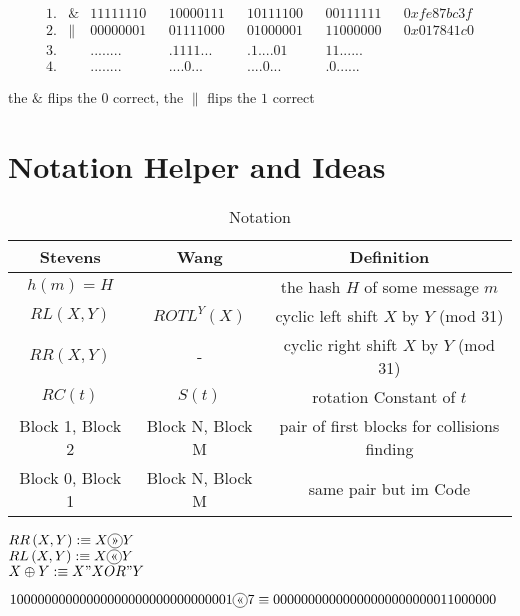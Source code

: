 \begin{align*}    
    1.& \& & 11111110 & & 10000111 & & 10111100 & & 00111111 & & 0xfe87bc3f \\
    2.& \| & 00000001 & & 01111000 & & 01000001 & & 11000000 & & 0x017841c0 \\
    3.&    & ........ & & .1111... & & .1....01 & & 11...... & &  \\
    4.&    & ........ & & ....0... & & ....0... & & .0...... & &  
\end{align*}

  the $\&$ flips the $0$ correct, the $\|$ flips the $1$ correct



\section{Notation Helper and Ideas}


\begin{table}[]
    \caption*{\large Notation}
    \begin{tabular}{ c | c | c }
    Stevens & Wang  & Definition  \\
    \hline 
    $h(m) = H$ &  & the hash $H$ of some message $m$\\
    $ RL \left(X , Y \right) $  & $ ROTL^{Y} \left( X\right) $  & cyclic left shift $X$ by $Y$ (mod 31) \\
    $ RR \left(X , Y \right) $  & -                             & cyclic right shift $X$ by $Y$ (mod 31) \\
    $ RC \left(t \right) $      &$ S \left(t \right) $          & rotation Constant of $t$ \\
    Block 1, Block 2 & Block N, Block M & pair of first blocks for collisions finding   \\
    Block 0, Block 1 & Block N, Block M & same pair but im Code\\
    \end{tabular}
    \label{notation}
\end{table}

$RR\left(X,Y\right) :\equiv X  \circled{>>} Y$\\
$RL\left(X,Y\right) :\equiv X  \circled{<<} Y$\\
$X \oplus Y :\equiv X "XOR"  Y$


\begin{align*}
10000000000000000000000000000001  \circled{<<} 7 &\equiv 00000000000000000000000011000000
\end{align*}
  


